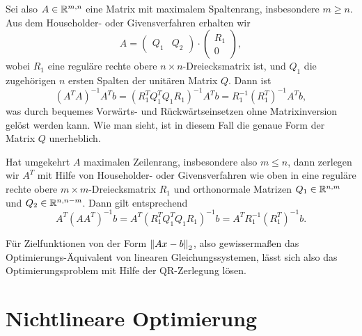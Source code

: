 Sei also $A\in\mathbb{R}^{m,n}$ eine Matrix mit maximalem Spaltenrang,
insbesondere $m \ge n$. Aus dem Householder- oder Givensverfahren
erhalten wir
\begin{equation}
  A = 
  \begin{pmatrix}
    Q_1 & Q_2
  \end{pmatrix}
  \cdot
  \begin{pmatrix}
    R_1\\
    0
  \end{pmatrix},
\end{equation}
wobei $R_1$ eine reguläre rechte obere $n\times n$-Dreiecksmatrix ist,
und $Q_1$ die zugehörigen $n$ ersten Spalten der unitären Matrix $Q$.
Dann ist
\begin{equation}
  (A^TA)^{-1}A^Tb = (R_1^TQ_1^TQ_1 R_1)^{-1}A^Tb =
  R_1^{-1}\left(R_1^T\right)^{-1}A^Tb,
\end{equation}
was durch bequemes Vorwärts- und Rückwärtseinsetzen ohne
Matrixinversion gelöst werden kann. Wie man sieht, ist in diesem Fall
die genaue Form der Matrix $Q$ unerheblich.

Hat umgekehrt $A$ maximalen Zeilenrang, insbesondere also $m \le n$,
dann zerlegen wir $A^T$ mit Hilfe von Householder- oder
Givensverfahren wie oben in eine reguläre rechte obere $m\times
m$-Dreiecksmatrix $R_1$ und orthonormale Matrizen $Q_1\in\mathbb{R}^{n,m}$
und $Q_2\in\mathbb{R}^{n,n-m}$. Dann gilt entsprechend
\begin{equation}
  A^T(AA^T)^{-1}b = A^T(R_1^TQ_1^TQ_1 R_1)^{-1}b =
  A^TR_1^{-1}\left(R_1^T\right)^{-1}b.
\end{equation}

Für Zielfunktionen von der Form $\left\lVert{Ax-b}\right\rVert_2$, also gewissermaßen
das Optimierungs-Äquivalent von linearen Gleichungssystemen, lässt
sich also das Optimierungsproblem mit Hilfe der QR-Zerlegung lösen.

\section{Nichtlineare Optimierung}


